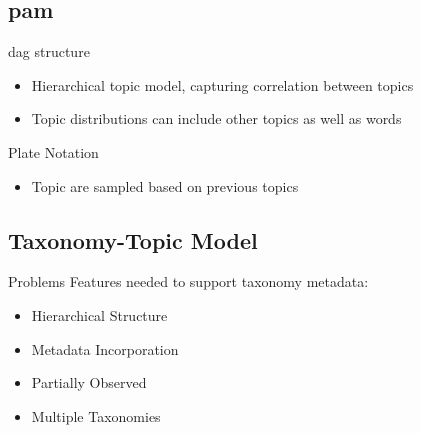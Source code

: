 \subsection{\acrlong{pam}}

\begin{frame}{\insertsubsection}{\gls{dag} structure}
    \begin{itemize}
    	\item<1-> Hierarchical topic model, capturing correlation between topics
    	\item<2-> Topic distributions can include other topics as well as words
    \end{itemize}
	
\end{frame}

\begin{frame}{\insertsubsection}{Plate Notation}
	\begin{figure}
			\centering
			\resizebox{0.45\columnwidth}{!}{%
			
			}
	\end{figure}
	\begin{itemize}
		\item Topic are sampled based on previous topics
	\end{itemize}
\end{frame}

\subsection{Taxonomy-Topic Model}

\begin{frame}{\insertsubsection}{Problems}
	Features needed to support taxonomy metadata:
	\begin{itemize}
		\item<1-> Hierarchical Structure
		\item<2-> Metadata Incorporation
		\item<3-> Partially Observed
		\item<4-> Multiple Taxonomies
	\end{itemize}
\end{frame}

